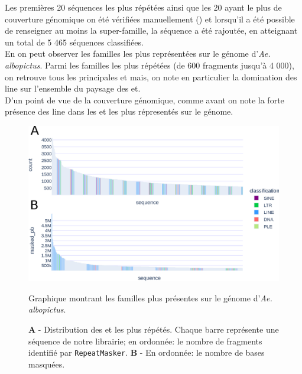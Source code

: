 \documentclass[10pt]{article}
\begin{document}
Les premières 20 séquences les plus répétées ainsi que les 20 ayant le plus de couverture génomique on été vérifiées manuellement (\linkautorefname{\ref{link12}}) et lorsqu'il a été possible de renseigner au moins la super-famille, la séquence a été rajoutée, en atteignant un total de 5 465 séquences classifiées. \\
En \figureautorefname{ \ref{fig:rep_mask}} on peut observer les familles les plus représentées sur le génome d'\textit{Ae. albopictus}. Parmi les familles les plus répétées (de 600 fragments jusqu'à 4 000), on retrouve tous les principales \acrlong{et} mais, on note en particulier la domination des \acrshort{line} sur l'ensemble du paysage des \acrshort{et}. \\
D'un point de vue de la couverture génomique, comme avant on note la forte présence des \acrshort{line} dans les \acrshort{et} les plus répresentés sur le génome.

\bigskip

\begin{figure}[H]
    \centering
    \includegraphics[width=\textwidth]{img/plots/rep_mask.eps}
    \caption{Graphique montrant les familles plus présentes sur le génome d'\textit{Ae. albopictus}.}
    \caption*{
    \scriptsize{
    \textbf{A} - Distribution des \acrlong{et} les plus répétés. Chaque barre représente une séquence de notre librairie; en ordonnée: le nombre de fragments identifié par \texttt{RepeatMasker}. \textbf{B} - En ordonnée: le nombre de bases masquées. 
    }}
    \label{fig:rep_mask}
\end{figure}
\end{document}
